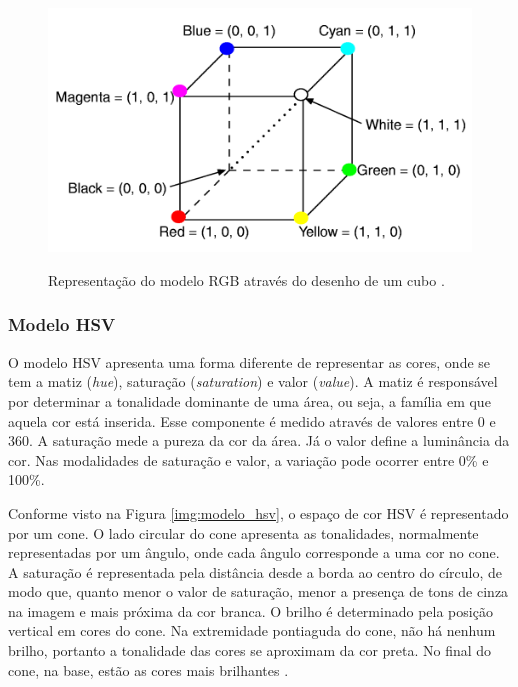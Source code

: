\begin{figure}[H]
    \centering
    {\includegraphics[scale=0.5]{figuras/modelo_rgb}}
    \caption{Representação do modelo RGB através do desenho de um cubo \cite{MOTTA}.}
    \label{img:modelo_rgb}
\end{figure}

\subsubsection{Modelo HSV}

O modelo HSV apresenta uma forma diferente de representar as cores, onde se tem a matiz (\textit{hue}), saturação (\textit{saturation}) e valor (\textit{value}). A matiz é responsável por determinar a tonalidade dominante de uma área, ou seja, a família em que aquela cor está inserida. Esse componente é medido através de valores entre 0 e 360. A saturação mede a pureza da cor da área. Já o valor define a luminância da cor. Nas modalidades de saturação e valor, a variação pode ocorrer entre 0\% e 100\%.

Conforme visto na Figura \ref{img:modelo_hsv}, o espaço de cor HSV é representado por um cone. O lado circular do cone apresenta as tonalidades, normalmente representadas por um ângulo, onde cada ângulo corresponde a uma cor no cone. A saturação é representada pela distância desde a borda ao centro do círculo, de modo que, quanto menor o valor de saturação, menor a presença de tons de cinza na imagem e mais próxima da cor branca. O brilho é determinado pela posição vertical em cores do cone. Na extremidade pontiaguda do cone, não há nenhum brilho, portanto a tonalidade das cores se aproximam da cor preta. No final do cone, na base, estão as cores mais brilhantes \cite{DARRIN}.

